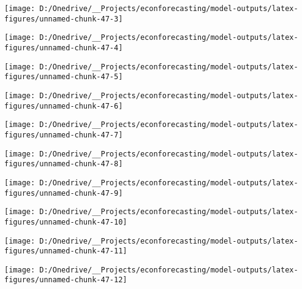 \documentclass[11pt, letterpaper]{article}\usepackage[]{graphicx}\usepackage[]{color}
\begin{document}
{\centering \texttt{[image: D:/Onedrive/\_\_Projects/econforecasting/model-outputs/latex-figures/unnamed-chunk-47-3]} 

}




{\centering \texttt{[image: D:/Onedrive/\_\_Projects/econforecasting/model-outputs/latex-figures/unnamed-chunk-47-4]} 

}




{\centering \texttt{[image: D:/Onedrive/\_\_Projects/econforecasting/model-outputs/latex-figures/unnamed-chunk-47-5]} 

}




{\centering \texttt{[image: D:/Onedrive/\_\_Projects/econforecasting/model-outputs/latex-figures/unnamed-chunk-47-6]} 

}




{\centering \texttt{[image: D:/Onedrive/\_\_Projects/econforecasting/model-outputs/latex-figures/unnamed-chunk-47-7]} 

}




{\centering \texttt{[image: D:/Onedrive/\_\_Projects/econforecasting/model-outputs/latex-figures/unnamed-chunk-47-8]} 

}




{\centering \texttt{[image: D:/Onedrive/\_\_Projects/econforecasting/model-outputs/latex-figures/unnamed-chunk-47-9]} 

}




{\centering \texttt{[image: D:/Onedrive/\_\_Projects/econforecasting/model-outputs/latex-figures/unnamed-chunk-47-10]} 

}




{\centering \texttt{[image: D:/Onedrive/\_\_Projects/econforecasting/model-outputs/latex-figures/unnamed-chunk-47-11]} 

}




{\centering \texttt{[image: D:/Onedrive/\_\_Projects/econforecasting/model-outputs/latex-figures/unnamed-chunk-47-12]} 

}
\end{document}
